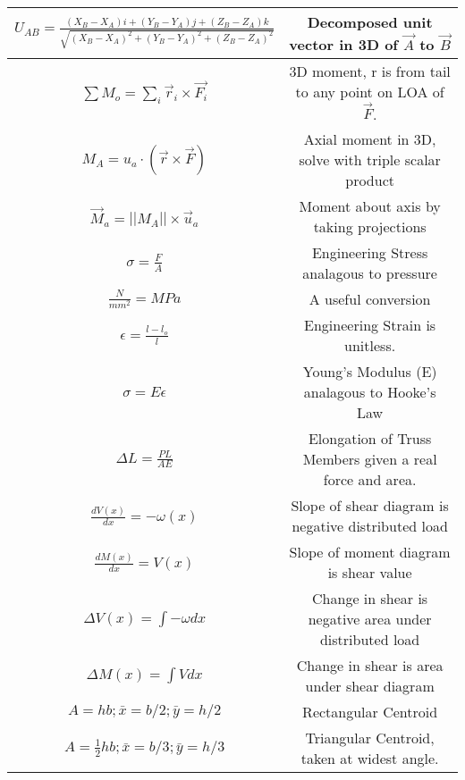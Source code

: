 \documentclass[12pt]{article}
\begin{document}
\begin{table}[h!]
\begin{center}
\begin{tabular}{|c | c |}
            $U_{AB} = \frac{(X_B-X_A)i + (Y_B - Y_A)j + (Z_B - Z_A)k}{\sqrt{(X_B-X_A)^2 + (Y_B - Y_A)^2+ (Z_B - Z_A)^2}}$ & Decomposed unit vector in 3D of $\vec A$ to $\vec B$\\\hline

            $\sum M_o = \sum_i \vec r_i \times \vec {F_i}$ & 3D moment, r is from tail to any point on LOA of $\vec F$.\\\hline

            $M_A = u_a \cdot (\vec r \times \vec F)$ & Axial moment in 3D, solve with triple scalar product\\\hline

            $\vec M_a = ||M_A||\times \vec u_a$ & Moment about axis by taking projections \\\hline

            $\sigma = \frac{F}{A}$ & Engineering Stress analagous to pressure\\\hline

            $\frac{N}{mm^2} = MPa$ & A useful conversion\\\hline

            $\epsilon = \frac{l-l_o}{l}$ & Engineering Strain is unitless.\\\hline

            $\sigma = E\epsilon$ & Young's Modulus (E) analagous to Hooke's Law\\\hline

            $\Delta L = \frac{PL}{AE}$ & Elongation of Truss Members given a real force and area. \\\hline

            $\frac{dV(x)}{dx} = -\omega (x)$ & Slope of shear diagram is negative distributed load\\\hline
            $\frac{dM(x)}{dx} = V(x)$ & Slope of moment diagram is shear value\\\hline

            $\Delta V(x) = \int -\omega dx$ & Change in shear is negative area under distributed load\\\hline

            $\Delta M(x) = \int V dx$ & Change in shear is area under shear diagram\\\hline

            $A = hb; \bar{x} = b/2; \bar{y} = h/2$ & Rectangular Centroid\\\hline

            $A = \frac{1}{2} hb; \bar{x} = b/3; \bar{y} = h/3$ & Triangular Centroid, taken at widest angle.\\\hline


\end{tabular}
\end{center}
\end{table}
\end{document}
